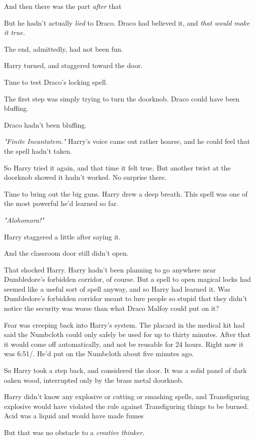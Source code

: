 And then there was the part \emph{after} that{\el}

But he hadn't actually \emph{lied} to Draco. Draco had believed it, and
\emph{that would make it true.}

The end, admittedly, had not been fun.

Harry turned, and staggered toward the door.

Time to test Draco's locking spell.

The first step was simply trying to turn the doorknob. Draco could have been
bluffing.

Draco hadn't been bluffing.

\emph{"Finite Incantatem."} Harry's voice came out rather hoarse, and he could
feel that the spell hadn't taken.

So Harry tried it again, and that time it felt true. But another twist at the
doorknob showed it hadn't worked. No surprise there.

Time to bring out the big guns. Harry drew a deep breath. This spell was one of
the most powerful he'd learned so far.

\emph{"Alohomora!"}

Harry staggered a little after saying it.

And the classroom door still didn't open.

That shocked Harry. Harry hadn't been planning to go anywhere near Dumbledore's
forbidden corridor, of course. But a spell to open magical locks had seemed
like a useful sort of spell anyway, and so Harry had learned it. Was
Dumbledore's forbidden corridor meant to lure people so stupid that they didn't
notice the security was worse than what Draco Malfoy could put on it?

Fear was creeping back into Harry's system. The placard in the medical kit had
said the Numbcloth could only safely be used for up to thirty minutes. After
that it would come off automatically, and not be reusable for 24 hours. Right
now it was 6:51\PM/. He'd put on the Numbcloth about five minutes ago.

So Harry took a step back, and considered the door. It was a solid panel of
dark oaken wood, interrupted only by the brass metal doorknob.

Harry didn't know any explosive or cutting or smashing spells, and
Transfiguring explosive would have violated the rule against Transfiguring
things to be burned. Acid was a liquid and would have made fumes{\el}

But that was no obstacle to a \emph{creative thinker.}

